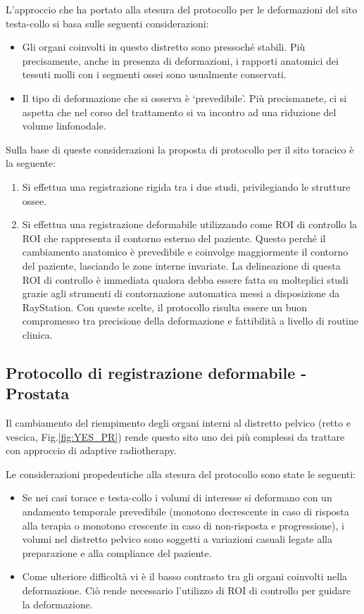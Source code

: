 L'approccio che ha portato alla stesura del protocollo per le deformazioni del sito testa-collo si basa sulle seguenti considerazioni:
\begin{itemize}
\item Gli organi coinvolti in questo distretto sono pressoché stabili. Più precisamente, anche in presenza di deformazioni, i rapporti anatomici dei tessuti molli con i segmenti ossei sono usualmente conservati.
\item Il tipo di deformazione che si osserva è `prevedibile'. Più precismanete, ci si aspetta che nel corso del trattamento si va incontro ad una riduzione del volume linfonodale.
\end{itemize}
Sulla base di queste considerazioni la proposta di protocollo per il sito toracico è la seguente:
\begin{enumerate}
\item Si effettua una registrazione rigida tra i due studi, privilegiando le strutture ossee.
\item Si effettua una registrazione deformabile utilizzando come ROI di controllo la ROI che rappresenta il contorno esterno del paziente. Questo perché il cambiamento anatomico è prevedibile e coinvolge maggiormente il contorno del paziente, lasciando le zone interne invariate. La delineazione di questa ROI di controllo è immediata qualora debba essere fatta su molteplici studi grazie agli strumenti di contornazione automatica messi a disposizione da RayStation. Con queste scelte, il protocollo risulta essere un buon compromesso tra precisione della deformazione e fattibilità a livello di routine clinica.
\end{enumerate}


\subsection{Protocollo di registrazione deformabile - Prostata}
Il cambiamento del riempimento degli organi interni al distretto pelvico (retto e vescica, Fig.\ref{fig:YES_PR}) rende questo sito uno dei più complessi da trattare con approccio di adaptive radiotherapy. 


Le considerazioni propedeutiche alla stesura del protocollo sono state le seguenti:
\begin{itemize}
\item Se nei casi torace e testa-collo i volumi di interesse si deformano con un andamento temporale prevedibile (monotono decrescente in caso di risposta alla terapia o monotono crescente in caso di non-risposta e progressione), i volumi nel distretto pelvico sono soggetti a variazioni casuali legate alla preparazione e alla compliance del paziente.
\item Come ulteriore difficoltà vi è il basso contrasto tra gli organi coinvolti nella deformazione. Ciò rende necessario l'utilizzo di ROI di controllo per guidare la deformazione.
\end{itemize}
 
